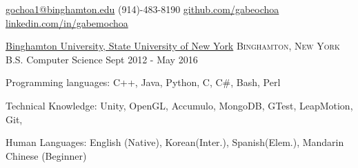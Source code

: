 \documentclass[11pt]{article}
\begin{document}


\nobreakvspace{0.3em}  %

\href{mailto:gochoa1@binghamton.edu}{gochoa1@binghamton.edu}\sbull
(914)-483-8190\sbull
\href{https://github.com/gabeochoa}{github.com/gabeochoa}\sbull
\href{https://www.linkedin.com/in/gabemochoa}{linkedin.com/in/gabemochoa}


\spacedhrule{0.1em}{0.5em}  %

\headedsection
{\href{http://www.binghamton.edu/index.php}{Binghamton University, State University of New York}}
{\textsc{Binghamton, New York}} {
    \inlineheadrightdate
    {B.S. Computer Science}
    {Sept 2012 - May 2016}
}


\spacedhrule{0.1em}{0.5em}  %

\inlineheadsection  %
{Programming languages:}
{ C++, Java,  Python, C, C\#, Bash, Perl }

\inlineheadsection
{Technical Knowledge:}
{ Unity, OpenGL, Accumulo, MongoDB, GTest, LeapMotion, Git, \latex }

\inlineheadsection
{Human Languages:}
{English (Native), Korean(Inter.), Spanish(Elem.), Mandarin Chinese (Beginner)}


\spacedhrule{0.1em}{0.5em}  %
\end{document}
